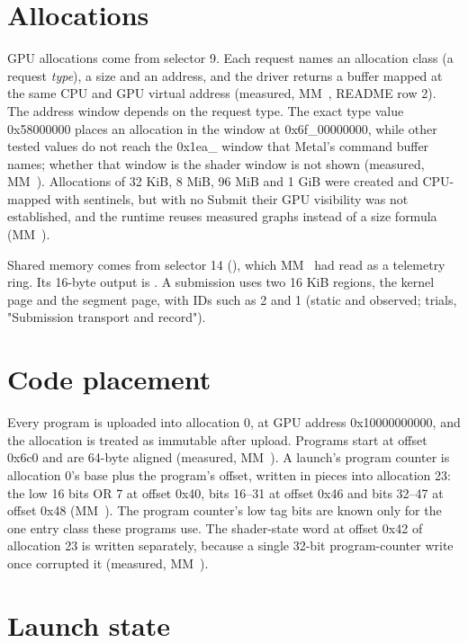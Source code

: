 \section{Allocations}\label{sec:memory-allocations-shared}

GPU allocations come from selector 9. Each request names an allocation class (a request \emph{type}), a size and an
address, and the driver returns a buffer mapped at the same CPU and GPU virtual address (measured, MM~, README
row 2). The address window depends on the request type. The exact type value 0x58000000 places an allocation in the
window at 0x6f\_00000000, while other tested values do not reach the 0x1ea\_ window that Metal's command buffer names;
whether that window is the shader window is not shown (measured, MM~). Allocations of 32 KiB, 8 MiB, 96 MiB
and 1 GiB were created and CPU-mapped with sentinels, but with no Submit their GPU visibility was not established, and
the runtime reuses measured graphs instead of a size formula (MM~).

Shared memory comes from selector 14 (), which MM~ had read as a telemetry
ring. Its 16-byte output is . A submission uses two 16 KiB
regions, the kernel page and the segment page, with IDs such as 2 and 1 (static and observed; trials, "Submission
transport and record").

\section{Code placement}\label{sec:code-placement-program}

Every program is uploaded into allocation 0, at GPU address 0x10000000000, and the allocation is treated as immutable
after upload. Programs start at offset 0x6c0 and are 64-byte aligned (measured, MM~). A launch's program
counter is allocation 0's base plus the program's offset, written in pieces into allocation 23: the low 16 bits OR 7 at
offset 0x40, bits 16–31 at offset 0x46 and bits 32–47 at offset 0x48 (MM~). The program counter's low tag bits are known
only for the one entry class these programs use. The shader-state word at offset 0x42 of
allocation 23 is written separately, because a single 32-bit program-counter write once corrupted it (measured,
MM~).

\section{Launch state}\label{sec:launch-state-command}

